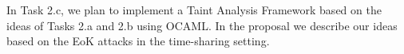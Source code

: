 %

In Task 2.c, we plan to implement a Taint Analysis Framework based on the ideas of Tasks 2.a and 2.b using OCAML.
In the proposal we describe our ideas based on the EoK attacks in the time-sharing setting. 
%



